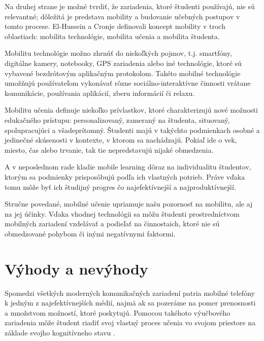 \documentclass[10pt,oneside,slovak,a4paper]{article}
\begin{document}
Na druhej strane je možné tvrdiť, že zariadenia, ktoré študenti používajú, nie sú relevantné; dôležitá je predstava mobility a budovanie učebných postupov v tomto procese\cite{KukulskaHulme2009}. El-Hussein a Cronje\cite{Hussein} definovali koncept mobility v troch oblastiach: mobilita technológie, mobilita učenia a mobilita študenta\cite{Kim2012}. 

Mobilitu technológie možno zhrnúť do niekoľkých pojmov, t.j. smartfóny, digitálne kamery, notebooky, GPS zariadenia alebo iné technológie, ktoré sú vybavené bezdrôtovým aplikačným protokolom. Takéto mobilné technológie umožňujú používateľom vykonávať rôzne sociálno-interaktívne činnosti vrátane komunikácie, používania aplikácií, zberu informácií či relaxu\cite{Kim2012}.

Mobilitu učenia definuje niekoľko prívlastkov, ktoré charakterizujú nové možnosti edukačného prístupu: personalizovaný, zameraný na študenta, situovaný, spolupracujúci a všadeprítomný. Študenti majú v takýchto podmienkach osobné a jedinečné skúsenosti v kontexte, v ktorom sa nachádzajú. Pokiaľ ide o vek, miesto, čas alebo trvanie, tak tie nepredstavujú nijaké obmedzenia\cite{Kim2012}. 

A v neposlednom rade kladie mobile learning dôraz na individualitu študentov, ktorým sa podmienky prisposôbujú podľa ich vlastných potrieb. Práve vďaka tomu môže byť ich študijný progres čo najefektívnejší a najproduktívnejší.

Stručne povedané, mobilné učenie upriamuje našu pozornosť na mobilitu, ale aj na jej účinky. Vďaka vhodnej technológii sa môžu študenti prostredníctvom mobilných zariadení vzdelávať a podieľať na činnostaich, ktoré nie sú obmedzované pohybom či inými negatívnymi faktormi.


\section{Výhody a nevýhody} \label{vyhodyanevyhody}

Spomedzi všetkých moderných komunikačných zariadení patria mobilné telefóny k jedným z najefektívnejších médií, najmä ak sa pozeráme na pomer prenosnosti a množstvom možností, ktoré poskytujú. Pomocou takéhoto výučbového zariadenia môže študent riadiť svoj vlastný proces učenia vo svojom priestore na základe svojho kognitívneho stavu \cite{Miangah2012}. 
\end{document}
